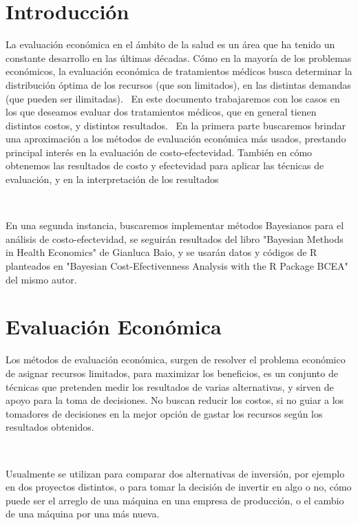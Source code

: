 \documentclass{article}
\begin{document}
\section{Introducción}

La evaluación económica en el ámbito de la salud es un área que ha tenido un constante desarrollo en las últimas décadas. Cómo en la mayoría de los problemas económicos, la evaluación económica de tratamientos médicos busca determinar la distribución óptima de los recursos (que son limitados), en las distintas demandas (que pueden ser ilimitadas).
\
En este documento trabajaremos con los casos en los que deseamos evaluar dos tratamientos médicos, que en general tienen distintos costos, y distintos resultados.
\
En la primera parte buscaremos brindar una aproximación a los métodos de evaluación económica más usados, prestando principal interés en la evaluación de costo-efectevidad. También en cómo obtenemos las resultados de costo y efectevidad para aplicar las técnicas de evaluación, y en la interpretación de los resultados

\

En una segunda instancia, buscaremos implementar métodos Bayesianos para el análisis de costo-efectevidad, se seguirán resultados del libro "Bayesian Methods in Health Economics" de Gianluca Baio, y se usarán datos y códigos de R planteados en "Bayesian Cost-Efectivenness Analysis with the R Package BCEA" del mismo autor.
 
\section{Evaluación Económica}

Los métodos de evaluación económica, surgen de resolver el problema económico de asignar recursos limitados, para maximizar los beneficios, es un conjunto de técnicas que pretenden medir los resultados de varias alternativas, y sirven de apoyo para la toma de decisiones. No buscan reducir los costos, si no guiar a los tomadores de decisiones en la mejor opción de gastar los recursos según los resultados obtenidos.

\

Usualmente se utilizan para comparar dos alternativas de inversión, por ejemplo en dos proyectos distintos, o para tomar la decisión de invertir en algo o no, cómo puede ser el arreglo de una máquina en una empresa de producción, o el cambio de una máquina por una más nueva.

\
\end{document}
